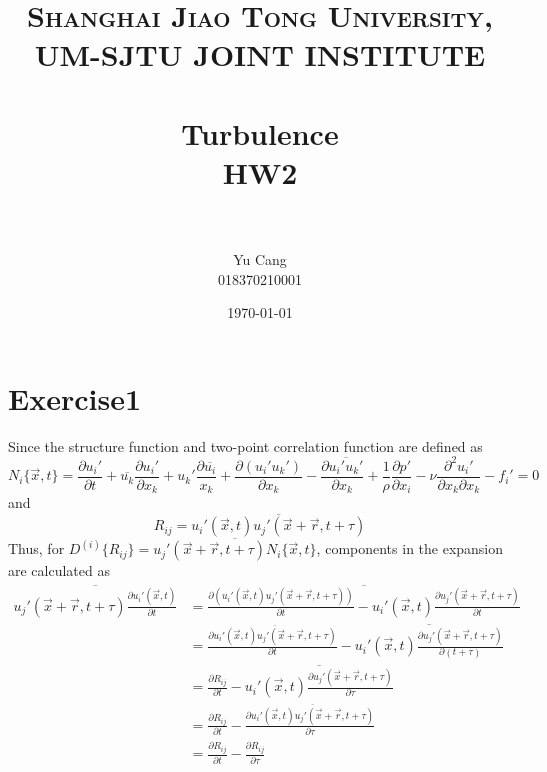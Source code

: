 \documentclass[paper=a4, fontsize=11pt]{scrartcl} %
\title{	
\normalfont \normalsize 
\textsc{Shanghai Jiao Tong University, UM-SJTU JOINT INSTITUTE} \\ [25pt] %
\horrule{0.5pt} \\[0.4cm] %
\huge Turbulence \\ HW2 \\ %
\horrule{2pt} \\[0.5cm] %
}
\author{Yu Cang \\ 018370210001}
\date{\normalsize \today}
\numberwithin{equation}{section} %
\numberwithin{figure}{section} %
\numberwithin{table}{section} %
\begin{document}
\maketitle

\section{Exercise1}
	Since the structure function and two-point correlation function are defined as
	\begin{equation}
		N_i\{\vec{x}, t\} = \frac{\partial u_i'}{\partial t} + \overline{u_k}\frac{\partial u_i'}{\partial x_k} + u_k' \frac{\partial \overline{u_i}}{x_k} + \frac{\partial (u_i' u_k')}{\partial x_k} - \frac{\partial \overline{u_i' u_k'}}{\partial x_k} + \frac{1}{\rho} \frac{\partial p'}{\partial x_i}-\nu \frac{\partial^2 u_i'}{\partial x_k \partial x_k} - f_i' = 0
	\end{equation}
	and
	\begin{equation}
		R_{ij} = \overline{u_i'(\vec{x}, t) u_j'(\vec{x}+\vec{r}, t + \tau)}
	\end{equation}
	Thus, for $D^{(i)}\{R_{ij}\} = \overline{u_j'(\vec{x} + \vec{r}, t+\tau) N_i\{\vec{x}, t\}}$, components in the expansion are calculated as
	\begin{equation}
		\begin{aligned}
			\overline{u_j'(\vec{x} + \vec{r}, t+\tau) \frac{\partial u_i'(\vec{x}, t)}{\partial t}}  
			& = \overline{\frac{\partial (u_i'(\vec{x}, t)u_j'(\vec{x} + \vec{r}, t+\tau))}{\partial t} - u_i'(\vec{x}, t) \frac{\partial u_j'(\vec{x} + \vec{r}, t+\tau)}{\partial t}}\\
			& = \frac{\partial \overline{u_i'(\vec{x}, t)u_j'(\vec{x} + \vec{r}, t+\tau)}}{\partial t} - \overline{u_i'(\vec{x}, t) \frac{\partial u_j'(\vec{x} + \vec{r}, t+\tau)}{\partial (t+\tau)}}\\
			& = \frac{\partial R_{ij}}{\partial t} - \overline{u_i'(\vec{x}, t) \frac{\partial u_j'(\vec{x} + \vec{r}, t+\tau)}{\partial \tau}}\\
			& = \frac{\partial R_{ij}}{\partial t} - \frac{\partial \overline{u_i'(\vec{x}, t) u_j'(\vec{x} + \vec{r}, t+\tau)}}{\partial \tau}\\
			& = \frac{\partial R_{ij}}{\partial t} - \frac{\partial R_{ij}}{\partial \tau}
		\end{aligned}
	\end{equation} 
	
\end{document}
